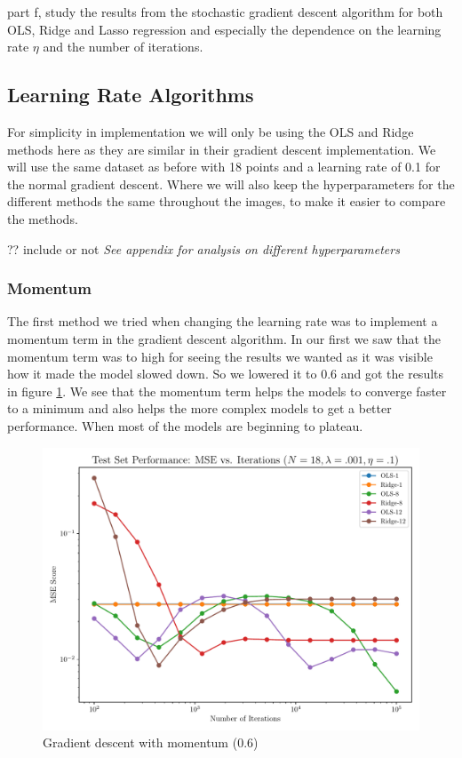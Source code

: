 \documentclass[amssymb,twocolumn,aps]{revtex4}
\begin{document}
part f, study the results from the stochastic gradient descent algorithm for both OLS, Ridge and Lasso regression and especially the dependence on the learning rate $\eta$ and the number of iterations.

\subsection{Learning Rate Algorithms}

For simplicity in implementation we will only be using the OLS and Ridge methods here as they are similar in their gradient descent implementation.
We will use the same dataset as before with 18 points and a learning rate of 0.1 for the normal gradient descent.
Where we will also keep the hyperparameters for the different methods the same throughout the images, to make it easier to compare the methods.

?? include or not \textit{See appendix for analysis on different hyperparameters}

\subsubsection{Momentum}

The first method we tried when changing the learning rate was to implement a momentum term in the gradient descent algorithm.
In our first we saw that the momentum term was to high for seeing the results we wanted as it was visible how it made the model slowed down.
So we lowered it to 0.6 and got the results in figure \ref{fig:GradMomentum}.
We see that the momentum term helps the models to converge faster to a minimum and also helps the more complex models to get a better performance.
When most of the models are beginning to plateau.
\\
\begin{figure}[h]
    \centering
    \includegraphics[width=.95 \linewidth]{Figures/OLS_Ridge_Momentum.pdf}
    \caption{Gradient descent with momentum (0.6)}
    \label{fig:GradMomentum}
\end{figure}
\end{document}
